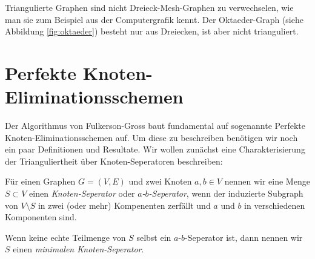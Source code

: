 \documentclass[../main.tex]{subfiles}
\begin{document}
\begin{bemerkung}
    Triangulierte Graphen sind nicht Dreieck-Mesh-Graphen zu verwechselen, wie man sie zum Beispiel aus der Computergrafik kennt. Der Oktaeder-Graph (siehe Abbildung \ref{fig:oktaeder}) besteht nur aus Dreiecken, ist aber nicht trianguliert.
\end{bemerkung}

\section{Perfekte Knoten-Eliminationsschemen}

Der Algorithmus von Fulkerson-Gross baut fundamental auf sogenannte Perfekte Knoten-Eliminationsschemen auf. Um diese zu beschreiben benötigen wir noch ein paar Definitionen und Resultate. Wir wollen zunächst eine Charakterisierung der Trianguliertheit über Knoten-Seperatoren beschreiben:

\begin{definition}\label{def:seperator}
    Für einen Graphen $G = (V, E)$ und zwei Knoten $a, b \in V$ nennen wir eine Menge $S \subset V$ einen \emph{Knoten-Seperator} oder \emph{$a$-$b$-Seperator}, wenn der induzierte Subgraph von $V \setminus S$ in zwei (oder mehr) Kompenenten zerfällt und $a$ und $b$ in verschiedenen Komponenten sind.
    
    Wenn keine echte Teilmenge von $S$ selbst ein $a$-$b$-Seperator ist, dann nennen wir $S$ einen \emph{minimalen Knoten-Seperator}.
\end{definition}
\end{document}

